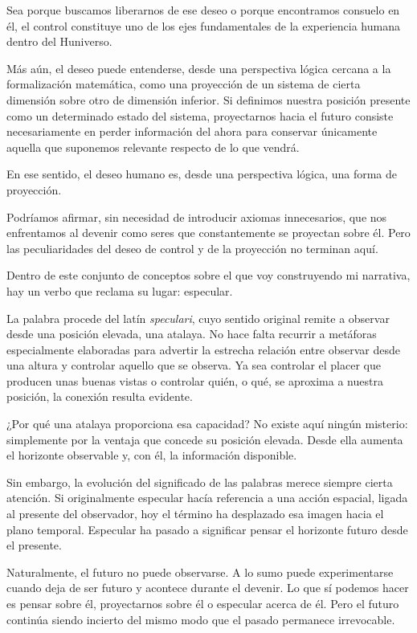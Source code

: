 \documentclass[12pt,a4paper]{article}
\begin{document}
Sea porque buscamos liberarnos de ese deseo o porque encontramos consuelo en él, el control constituye uno de los ejes fundamentales de la experiencia humana dentro del Huniverso.

Más aún, el deseo puede entenderse, desde una perspectiva lógica cercana a la formalización matemática, como una proyección de un sistema de cierta dimensión sobre otro de dimensión inferior. Si definimos nuestra posición presente como un determinado estado del sistema, proyectarnos hacia el futuro consiste necesariamente en perder información del ahora para conservar únicamente aquella que suponemos relevante respecto de lo que vendrá.

En ese sentido, el deseo humano es, desde una perspectiva lógica, una forma de proyección.

Podríamos afirmar, sin necesidad de introducir axiomas innecesarios, que nos enfrentamos al devenir como seres que constantemente se proyectan sobre él. Pero las peculiaridades del deseo de control y de la proyección no terminan aquí.

Dentro de este conjunto de conceptos sobre el que voy construyendo mi narrativa, hay un verbo que reclama su lugar: especular.

La palabra procede del latín \textit{speculari}, cuyo sentido original remite a observar desde una posición elevada, una atalaya. No hace falta recurrir a metáforas especialmente elaboradas para advertir la estrecha relación entre observar desde una altura y controlar aquello que se observa. Ya sea controlar el placer que producen unas buenas vistas o controlar quién, o qué, se aproxima a nuestra posición, la conexión resulta evidente.

¿Por qué una atalaya proporciona esa capacidad? No existe aquí ningún misterio: simplemente por la ventaja que concede su posición elevada. Desde ella aumenta el horizonte observable y, con él, la información disponible.

Sin embargo, la evolución del significado de las palabras merece siempre cierta atención. Si originalmente especular hacía referencia a una acción espacial, ligada al presente del observador, hoy el término ha desplazado esa imagen hacia el plano temporal. Especular ha pasado a significar pensar el horizonte futuro desde el presente.

Naturalmente, el futuro no puede observarse. A lo sumo puede experimentarse cuando deja de ser futuro y acontece durante el devenir. Lo que sí podemos hacer es pensar sobre él, proyectarnos sobre él o especular acerca de él. Pero el futuro continúa siendo incierto del mismo modo que el pasado permanece irrevocable.
\end{document}
